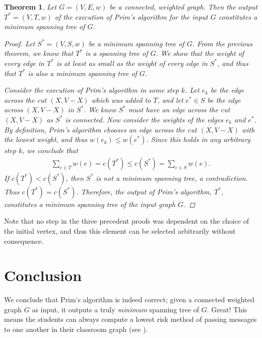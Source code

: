 \documentclass[a4paper,11pt]{report}
\theoremstyle{plain}
\newtheorem{thm}{Theorem}[section]
\theoremstyle{definition}
\begin{document}
\begin{thm}
Let $G = (V, E, w)$ be a connected, weighted graph. Then the output
$T^* = (V, T, w)$ of the execution of Prim's algorithm for the input $G$
constitutes a minimum spanning tree of $G$.

\begin{proof}
Let $S^* = (V, S, w)$ be a minimum spanning tree of $G$. From the previous
theorem, we know that $T^*$ is a spanning tree of $G$. We show that the weight
of every edge in $T^*$ is at least as small as the weight of every edge in
$S^*$, and thus that $T^*$ is also a minimum spanning tree of $G$.

Consider the execution of Prim's algorithm in some step $k$. Let $e_k$ be the
edge across the cut $(X, V - X)$ which was added to $T$, and let $e^* \in S$ be
the edge across $(X, V - X)$ in $S^*$. We know $S^*$ must have an edge across
the cut $(X, V - X)$ as $S^*$ is connected. Now consider the weights of the
edges $e_k$ and $e^*$. By definition, Prim's algorithm chooses an edge across
the cut $(X, V - X)$ with the lowest weight, and thus $w(e_k) \leq w(e^*)$.
Since this holds in any arbitrary step $k$, we conclude that
\begin{align*}
    \sum_{e \in T}{w(e)} = c(T^*) \leq c(S^*) = \sum_{e \in S}{w(e)}.
\end{align*}
If $c(T^*) < c(S^*)$, then $S^*$ is not a minimum spanning tree, a
contradiction. Thus $c(T^*) = c(S^*)$.  Therefore, the output of Prim's
algorithm, $T^*$, constitutes a minimum spanning tree of the input graph $G$.
\end{proof}
\end{thm}

Note that no step in the three precedent proofs was dependent on the choice of
the initial vertex, and thus this element can be selected arbitrarily without
consequence.

\section{Conclusion}

We conclude that Prim's algorithm is indeed correct; given a connected weighted
graph $G$ as input, it outputs a truly \emph{minimum} spanning tree of $G$.
Great! This means the students can always compute a lowest risk method of
passing messages to one another in their classroom graph (see
).


\end{document}
